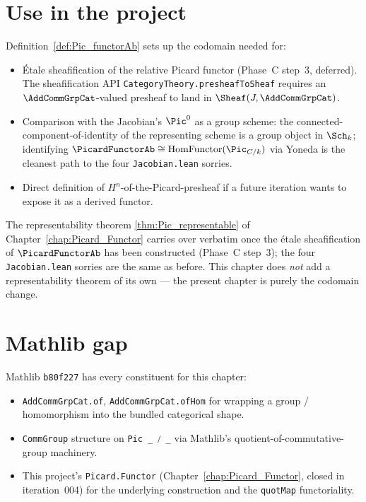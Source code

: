 \section{Use in the project}

Definition~\ref{def:Pic_functorAb} sets up the codomain needed for:

\begin{itemize}
  \item Étale sheafification of the relative Picard functor (Phase~C step~3, deferred). The sheafification API \lstinline{CategoryTheory.presheafToSheaf} requires an $\AddCommGrpCat$-valued presheaf to land in $\Sheaf(J, \AddCommGrpCat)$.
  \item Comparison with the Jacobian's $\Pic^0$ as a group scheme: the connected-component-of-identity of the representing scheme is a group object in $\Sch_k$; identifying $\PicardFunctorAb \cong \mathrm{HomFunctor}(\Pic_{C/k})$ via Yoneda is the cleanest path to the four \lstinline{Jacobian.lean} sorries.
  \item Direct definition of $H^n$-of-the-Picard-presheaf if a future iteration wants to expose it as a derived functor.
\end{itemize}

The representability theorem \ref{thm:Pic_representable} of Chapter~\ref{chap:Picard_Functor} carries over verbatim once the étale sheafification of $\PicardFunctorAb$ has been constructed (Phase~C step~3); the four \lstinline{Jacobian.lean} sorries are the same as before. This chapter does \emph{not} add a representability theorem of its own — the present chapter is purely the codomain change.

\section{Mathlib gap}

Mathlib \texttt{b80f227} has every constituent for this chapter:
\begin{itemize}
  \item \lstinline{AddCommGrpCat.of}, \lstinline{AddCommGrpCat.ofHom} for wrapping a group / homomorphism into the bundled categorical shape.
  \item \lstinline{CommGroup} structure on \lstinline{Pic _ ⧸ _} via Mathlib's quotient-of-commutative-group machinery.
  \item This project's \lstinline{Picard.Functor} (Chapter~\ref{chap:Picard_Functor}, closed in iteration~004) for the underlying construction and the \lstinline{quotMap} functoriality.
\end{itemize}

